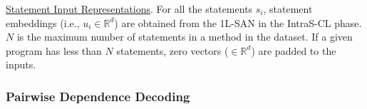 \vspace{1pt} \underline{Statement Input Representations}. For all the
statements $s_i$, statement embeddings (i.e., $u_i \in
\mathbb{R}^d$) are obtained from the 1L-SAN in the IntraS-CL phase.
$N$ is the maximum number of statements in a method in the dataset. If
a given program has less than $N$ statements,
zero vectors ($\in \mathbb{R}^d$) are padded to the inputs.




\vspace{1pt}
\subsubsection{\bf Pairwise Dependence Decoding}

